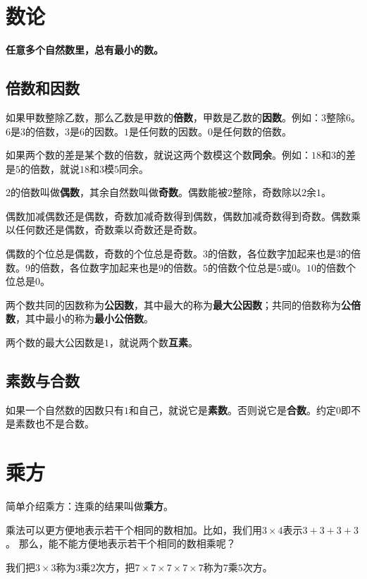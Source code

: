 \documentclass[12pt,UTF8]{ctexart}
\begin{document}
\section{数论}

\textbf{任意多个自然数里，总有最小的数。}

\subsection{倍数和因数}

如果甲数整除乙数，那么乙数是甲数的\textbf{倍数}，甲数是乙数的\textbf{因数}。例如：\( 3 \)整除\( 6 \)。\( 6 \)是\( 3 \)的倍数，\( 3 \)是\( 6 \)的因数。$1$是任何数的因数。$0$是任何数的倍数。

如果两个数的差是某个数的倍数，就说这两个数模这个数\textbf{同余}。例如：\( 18 \)和\( 3 \)的差是\( 5 \)的倍数，就说\( 18 \)和\( 3 \)模\( 5 \)同余。

$2$的倍数叫做\textbf{偶数}，其余自然数叫做\textbf{奇数}。偶数能被$2$整除，奇数除以$2$余$1$。

偶数加减偶数还是偶数，奇数加减奇数得到偶数，偶数加减奇数得到奇数。偶数乘以任何数还是偶数，奇数乘以奇数还是奇数。

偶数的个位总是偶数，奇数的个位总是奇数。$3$的倍数，各位数字加起来也是$3$的倍数。$9$的倍数，各位数字加起来也是$9$的倍数。$5$的倍数个位总是$5$或$0$。$10$的倍数个位总是$0$。

两个数共同的因数称为\textbf{公因数}，其中最大的称为\textbf{最大公因数}；共同的倍数称为\textbf{公倍数}，其中最小的称为\textbf{最小公倍数}。

两个数的最大公因数是\( 1 \)，就说两个数\textbf{互素}。

\subsection{素数与合数}

如果一个自然数的因数只有\( 1 \)和自己，就说它是\textbf{素数}。否则说它是\textbf{合数}。约定\( 0 \)即不是素数也不是合数。

\section{乘方}

简单介绍乘方：连乘的结果叫做\textbf{乘方}。

乘法可以更方便地表示若干个相同的数相加。比如，我们用\( 3 \times 4 \)表示\( 3+3+3+3 \)。
那么，能不能方便地表示若干个相同的数相乘呢？

我们把\( 3\times 3 \)称为\( 3 \)乘\( 2 \)次方，把\( 7\times 7\times 7\times 7\times 7 \)称为\( 7 \)乘\( 5 \)次方。
\end{document}
